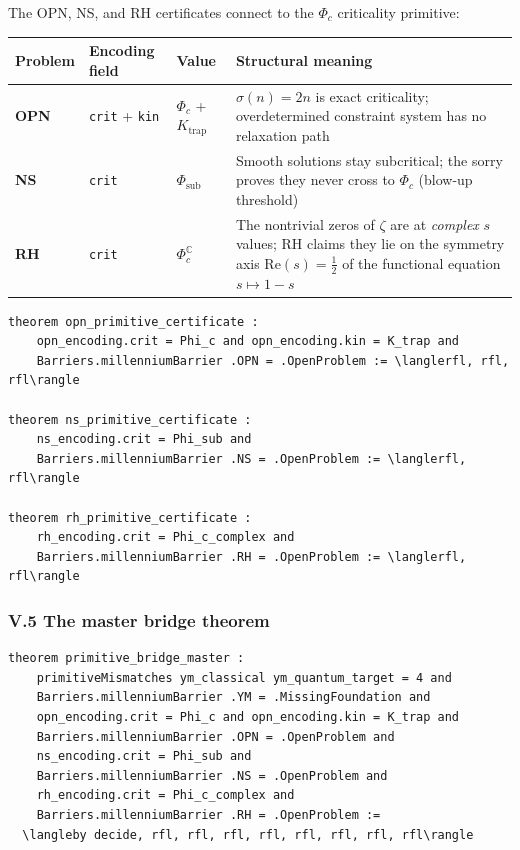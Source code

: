 \documentclass[12pt,a4paper]{article}
\begin{document}
The OPN, NS, and RH certificates connect to the $\Phi_c$ criticality primitive:

\begin{table}[htbp]
\centering
\small
{}
\begin{tabularx}{\textwidth}{>{\centering\arraybackslash}X >{\centering\arraybackslash}X >{\centering\arraybackslash}X >{\centering\arraybackslash}X}
\toprule
\rowcolor{gray!25}\textbf{Problem} & \textbf{Encoding field} & \textbf{Value} & \textbf{Structural meaning} \\
\midrule
\rowcolors{1}{white}{gray!10}
\textbf{OPN} & \texttt{crit} + \texttt{kin} & $\Phi_c$ + $K_\text{trap}$ & $\sigma(n) = 2n$ is exact criticality; overdetermined constraint system has no relaxation path \\
\textbf{NS} & \texttt{crit} & $\Phi_\text{sub}$ & Smooth solutions stay subcritical; the sorry proves they never cross to $\Phi_c$ (blow-up threshold) \\
\textbf{RH} & \texttt{crit} & $\Phi_c^\mathbb{C}$ & The nontrivial zeros of $\zeta$ are at \emph{complex} $s$ values; RH claims they lie on the symmetry axis $\text{Re}(s)=\frac{1}{2}$ of the functional equation $s \mapsto 1-s$ \\
\bottomrule
\end{tabularx}
\end{table}

\begin{lstlisting}[language=lean]
theorem opn_primitive_certificate :
    opn_encoding.crit = Phi_c and opn_encoding.kin = K_trap and
    Barriers.millenniumBarrier .OPN = .OpenProblem := \langlerfl, rfl, rfl\rangle

theorem ns_primitive_certificate :
    ns_encoding.crit = Phi_sub and
    Barriers.millenniumBarrier .NS = .OpenProblem := \langlerfl, rfl\rangle

theorem rh_primitive_certificate :
    rh_encoding.crit = Phi_c_complex and
    Barriers.millenniumBarrier .RH = .OpenProblem := \langlerfl, rfl\rangle
\end{lstlisting}

\subsubsection{V.5 The master bridge theorem}

\begin{lstlisting}[language=lean]
theorem primitive_bridge_master :
    primitiveMismatches ym_classical ym_quantum_target = 4 and
    Barriers.millenniumBarrier .YM = .MissingFoundation and
    opn_encoding.crit = Phi_c and opn_encoding.kin = K_trap and
    Barriers.millenniumBarrier .OPN = .OpenProblem and
    ns_encoding.crit = Phi_sub and
    Barriers.millenniumBarrier .NS = .OpenProblem and
    rh_encoding.crit = Phi_c_complex and
    Barriers.millenniumBarrier .RH = .OpenProblem :=
  \langleby decide, rfl, rfl, rfl, rfl, rfl, rfl, rfl, rfl\rangle
\end{lstlisting}
\end{document}
